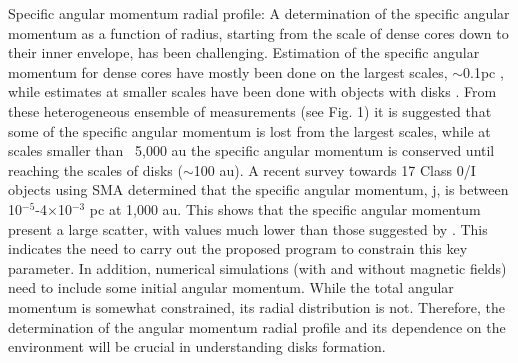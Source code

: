 Specific angular momentum radial profile: A determination of the specific angular momentum as a function of radius, starting from the scale of dense cores down to their inner envelope, has been challenging. 
Estimation of the specific angular momentum for dense cores have mostly been done on the largest scales, $\sim$0.1pc \citep{Goodman_1993,Caselli_2002}, while estimates at smaller scales have been done with objects with disks \citep[Class 0/I][]{1997ApJ...488..317O,Yen_2015}. 
From these heterogeneous ensemble of measurements (see Fig. 1) it is suggested \citep{Belloche_2013} that some of the specific angular momentum is lost from the largest scales, while at scales smaller than ~5,000 au the specific angular momentum is conserved until reaching the scales of disks ($\sim$100 au). 
A recent survey towards 17 Class 0/I objects using SMA \citep{Yen_2015} determined that the specific angular momentum, j, is between 10$^{-5}$-4$\times$10$^{-3}$ \kms pc at 1,000 au. This shows that the specific angular momentum present a large scatter, with values much lower than those suggested by \cite{Belloche_2013}. 
This indicates the need to carry out the proposed program to constrain this key parameter.
In addition, numerical simulations (with and without magnetic fields) need to include some initial angular momentum. While the total angular momentum is somewhat constrained, its radial distribution is not. Therefore, the determination of the angular momentum radial profile and its dependence on the environment will be crucial in understanding disks formation.

  